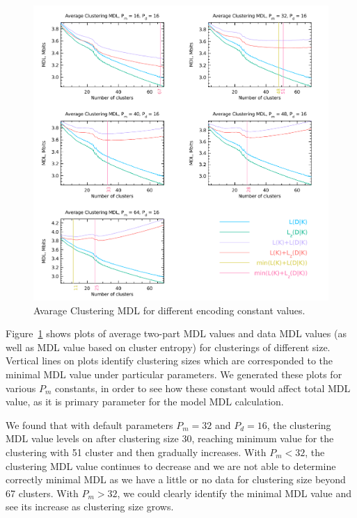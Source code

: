 \begin{figure}[H]
\center
\includegraphics[width=5.0in]{img/mdl-clust_clustering-mdl_1.pdf}
\caption{Avarage Clustering MDL for different encoding constant values.}
\label{fig:clustering-mdl}
\end{figure}



Figure~\ref{fig:clustering-mdl} shows plots of average two-part MDL values and
data MDL values (as well as MDL value based on cluster entropy) for clusterings
of different size. Vertical lines on plots identify clustering sizes which are
corresponded to the minimal MDL value under particular parameters.
We generated these plots for various $P_m$ constants, in order to see how these
constant would affect total MDL value, as it is primary parameter for the model
MDL calculation.

We found that with default parameters $P_m = 32$ and $P_d = 16$, the clustering
MDL value levels on after clustering size 30, reaching minimum value for
the clustering with 51 cluster and then gradually increases. With $P_m < 32$,
the clustering MDL value continues to decrease and we are not able to determine
correctly minimal MDL as we have a little or no data for clustering size beyond
67 clusters. With $P_m > 32$, we could clearly identify the minimal MDL value
and see its increase as clustering size grows.

